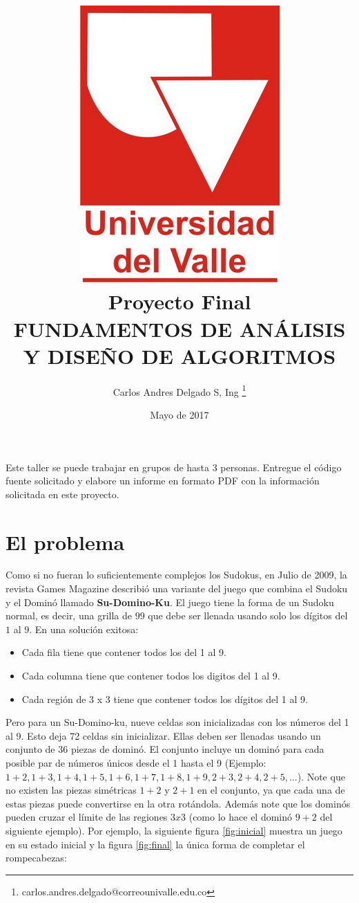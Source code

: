 \documentclass[twocolumn]{article}
\title{	\includegraphics[scale=0.2]{univalle.jpg} \\ Proyecto Final \\FUNDAMENTOS DE ANÁLISIS Y DISEÑO DE ALGORITMOS}
\author{Carlos Andres Delgado S, Ing \footnote{ carlos.andres.delgado@correounivalle.edu.co }}
\date{Mayo de 2017}
\begin{document}
\maketitle

Este taller se puede trabajar en grupos de hasta 3 personas. Entregue el código fuente solicitado y elabore un informe en formato PDF con la información solicitada en este proyecto.

\section{El problema}

Como si no fueran lo suficientemente complejos los Sudokus, en Julio de 2009, la revista Games Magazine describió una variante del juego que combina el Sudoku y el Dominó llamado \textbf{Su-Domino-Ku}. El juego tiene la forma de un Sudoku normal, es decir, una grilla de $9 9$ que debe ser llenada usando solo los dígitos del $1$ al $9$. En una solución exitosa:

\begin{itemize}
	\item Cada fila tiene que contener todos los  del 1 al 9.
	\item Cada columna tiene que contener todos los digitos del 1 al 9.
	\item Cada región de 3 x 3 tiene que contener todos los dígitos del 1 al 9.
\end{itemize}

Pero para un Su-Domino-ku, nueve celdas son inicializadas con los números del 1 al 9. Esto deja 72 celdas sin inicializar. Ellas deben ser llenadas usando un conjunto de 36 piezas de dominó. El conjunto incluye un dominó para cada posible par de números únicos desde el 1 hasta el 9 (Ejemplo: $1+2, 1+3, 1+4, 1+5, 1+6, 1+7, 1+8, 1+9, 2+3, 2+4, 2+5, . . . $). Note que no existen las piezas simétricas $1+2$ y $2+1$ en el conjunto, ya que cada una de estas piezas puede convertirse en la otra rotándola. Además note que los dominós pueden cruzar el límite de las regiones $3 x 3$ (como lo hace el dominó $9+2$ del siguiente ejemplo). Por ejemplo, la siguiente figura \ref{fig:inicial} muestra un juego en su estado inicial y la figura \ref{fig:final} la única forma de completar el rompecabezas:
\end{document}
